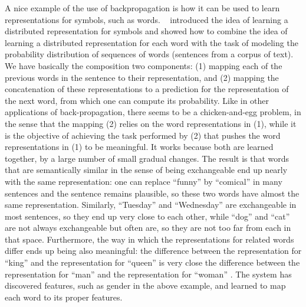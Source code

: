 \documentclass[11pt]{article} %
\begin{document}
A nice example of the use of backpropagation is how it can be used to learn
representations for symbols, such as words. ~\citet{Hinton86b} introduced the idea
of learning a distributed representation for symbols and \citet{BenDucVin01-short}
showed how to combine the idea of learning a distributed
representation for each word with the task of modeling the probability
distribution of sequences of words (sentences from a corpus of text). We
have basically the composition two components: (1) mapping each of the
previous words in the sentence to their representation, and (2) mapping the
concatenation of these representations to a prediction for the
representation of the next word, from which one can compute its
probability.  Like in other applications of back-propagation, there seems
to be a chicken-and-egg problem, in the sense that the mapping (2) relies
on the word representations in (1), while it is the objective of achieving
the task performed by (2) that pushes the word representations in (1) to be
meaningful. It works because both are learned together, by a large number
of small gradual changes. The result is that words that are semantically
similar in the sense of being exchangeable end up nearly with the same
representation: one can replace ``funny'' by ``comical'' in many sentences and
the sentence remains plausible, so these two words have almost the same
representation. Similarly, ``Tuesday'' and ``Wednesday'' are exchangeable in
most sentences, so they end up very close to each other, while ``dog'' and
``cat'' are not always exchangeable but often are, so they are not too far
from each in that space. Furthermore, the way in which the representations
for related words differ ends up being also meaningful: the difference
between the representation for ``king'' and the representation for ``queen'' is
very close the difference between the representation for ``man'' and the
representation for ``woman'' \citep{Mikolov-et-al-ICLR2013}. The system has discovered
features, such as gender in the above example, and learned to map each word
to its proper features.

\end{document}
